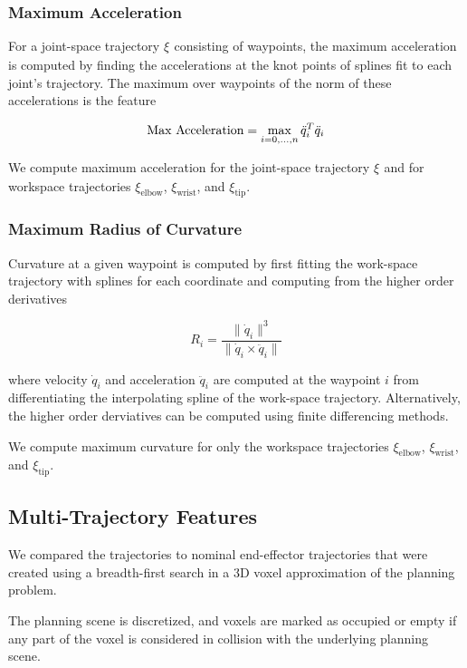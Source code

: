 \documentclass[letterpaper, 10 pt, conference]{ieeeconf}  %
\newcommand{\tj}[1]{\ensuremath{\xi_\text{#1}}}
\begin{document}
\subsubsection{Maximum Acceleration}

For a joint-space trajectory \tj{} consisting of waypoints, the maximum acceleration is computed by finding the accelerations at the knot points of splines fit to each joint's trajectory. The maximum over waypoints of the norm of these accelerations is the feature

\begin{equation}
\text{Max Acceleration} = \max_{i={0,\mathellipsis,n}} {\ddot{q}_i}^T\ddot{q}_i
\end{equation}

We compute maximum acceleration for the joint-space trajectory \tj{} and for workspace trajectories $\xi_\text{elbow}$, $\xi_\text{wrist}$, and $\xi_\text{tip}$.

\subsubsection{Maximum Radius of Curvature}

Curvature at a given waypoint is computed by first fitting the work-space trajectory with splines for each coordinate and computing from the higher order derivatives

\begin{equation}
R_i = \frac{\|\dot{q}_i\|^3}{\|\dot{q}_i \times \ddot{q}_i\|}
\end{equation}

where velocity $\dot{q}_i$ and acceleration $\ddot{q}_i$ are computed at the waypoint $i$ from differentiating the interpolating spline of the work-space trajectory. Alternatively, the higher order derviatives can be computed using finite differencing methods.

We compute maximum curvature for only the workspace trajectories $\xi_\text{elbow}$, $\xi_\text{wrist}$, and $\xi_\text{tip}$.

\subsection{Multi-Trajectory Features}
\label{subsec:multi_traj_feat}

We compared the trajectories to nominal end-effector trajectories that were created using a breadth-first search in a 3D voxel approximation of the planning problem. 

The planning scene is discretized, and voxels are marked as occupied or empty if any part of the voxel is considered in collision with the underlying planning scene. 
\end{document}
